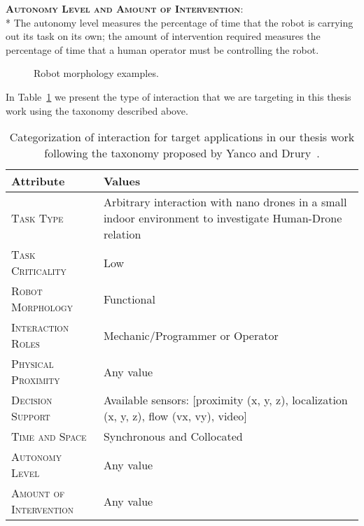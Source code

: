 {\bfseries \scshape Autonomy Level and Amount of Intervention}:\\*
The autonomy level measures the percentage of time that the robot is carrying out its task on its own; 
the amount of intervention required measures the percentage of time that a human operator must be controlling the robot.

\begin{figure}[t]
    \centering
    \quad
    \quad
    \caption{Robot morphology examples.}\label{fig:robot_morphology}
\end{figure}

In Table~\ref{table:taxonomy_target} we present the type of interaction that we are targeting in this thesis work using the taxonomy described above.

\begin{table}[H]
\centering
    \begin{tabular}{|p{}|m{}|}
    \hline
    \rowcolor{bluepoli!40}
    \textbf{Attribute} & \textbf{Values} \\
    \hline \hline
    {\scshape Task Type} & Arbitrary interaction with nano drones in a small indoor environment to investigate Human-Drone relation \\
    \hline
    {\scshape Task Criticality} & Low \\
    \hline
    {\scshape Robot Morphology} & Functional \\
    \hline
    {\scshape Interaction Roles} & Mechanic/Programmer or Operator \\
    \hline
    {\scshape Physical Proximity} &  Any value \\
    \hline
    {\scshape Decision Support} & Available sensors: [proximity (x, y, z), localization (x, y, z), flow (vx, vy), video] \\
    \hline
    {\scshape Time and Space} & Synchronous and Collocated \\
    \hline
    {\scshape Autonomy Level} & Any value \\
    \hline
    {\scshape Amount of Intervention} & Any value \\
    \hline
    \end{tabular}
    \\[10pt]
    \caption[Taxonomy for interaction of target applications]{Categorization of interaction for target applications in our thesis work following the taxonomy proposed by Yanco and Drury~\cite{yanco2004taxonomy}.}\label{table:taxonomy_target}
\end{table}


